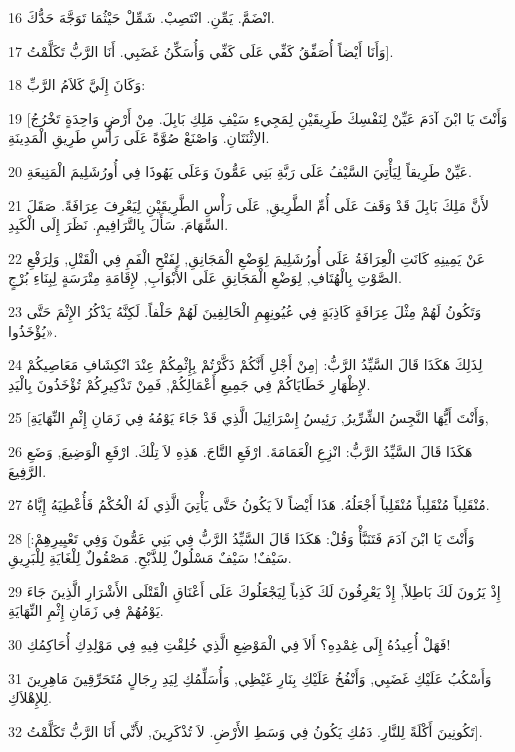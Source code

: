 \par 16 انْضَمَّ. يَمِّنِ. انْتَصِبْ. شَمِّلْ حَيْثُمَا تَوَجَّهَ حَدُّكَ.
\par 17 وَأَنَا أَيْضاً أُصَفِّقُ كَفِّي عَلَى كَفِّي وَأُسَكِّنُ غَضَبِي. أَنَا الرَّبُّ تَكَلَّمْتُ].
\par 18 وَكَانَ إِلَيَّ كَلاَمُ الرَّبِّ:
\par 19 [وَأَنْتَ يَا ابْنَ آدَمَ عَيِّنْ لِنَفْسِكَ طَرِيقَيْنِ لِمَجِيءِ سَيْفِ مَلِكِ بَابِلَ. مِنْ أَرْضٍ وَاحِدَةٍ تَخْرُجُ الاِثْنَتَانِ. وَاصْنَعْ صُوَّةً عَلَى رَأْسِ طَرِيقِ الْمَدِينَةِ.
\par 20 عَيِّنْ طَرِيقاً لِيَأْتِيَ السَّيْفُ عَلَى رَبَّةِ بَنِي عَمُّونَ وَعَلَى يَهُوذَا فِي أُورُشَلِيمَ الْمَنِيعَةِ.
\par 21 لأَنَّ مَلِكَ بَابِلَ قَدْ وَقَفَ عَلَى أُمِّ الطَّرِيقِ, عَلَى رَأْسِ الطَّرِيقَيْنِ لِيَعْرِفَ عِرَافَةً. صَقَلَ السِّهَامَ. سَأَلَ بِالتَّرَافِيمِ. نَظَرَ إِلَى الْكَبِدِ.
\par 22 عَنْ يَمِينِهِ كَانَتِ الْعِرَافَةُ عَلَى أُورُشَلِيمَ لِوَضْعِ الْمَجَانِقِ, لِفَتْحِ الْفَمِ فِي الْقَتْلِ, وَلِرَفْعِ الصَّوْتِ بِالْهُتَافِ, لِوَضْعِ الْمَجَانِقِ عَلَى الأَبْوَابِ, لإِقَامَةِ مِتْرَسَةٍ لِبِنَاءِ بُرْجٍ.
\par 23 وَتَكُونُ لَهُمْ مِثْلَ عِرَافَةٍ كَاذِبَةٍ فِي عُيُونِهِمِ الْحَالِفِينَ لَهُمْ حَلْفاً. لَكِنَّهُ يَذْكُرُ الإِثْمَ حَتَّى يُؤْخَذُوا».
\par 24 لِذَلِكَ هَكَذَا قَالَ السَّيِّدُ الرَّبُّ: [مِنْ أَجْلِ أَنَّكُمْ ذَكَّرْتُمْ بِإِثْمِكُمْ عِنْدَ انْكِشَافِ مَعَاصِيكُمْ لإِظْهَارِ خَطَايَاكُمْ فِي جَمِيعِ أَعْمَالِكُمْ, فَمِنْ تَذْكِيرِكُمْ تُؤْخَذُونَ بِالْيَدِ.
\par 25 [وَأَنْتَ أَيُّهَا النَّجِسُ الشِّرِّيرُ, رَئِيسُ إِسْرَائِيلَ الَّذِي قَدْ جَاءَ يَوْمُهُ فِي زَمَانِ إِثْمِ النِّهَايَةِ,
\par 26 هَكَذَا قَالَ السَّيِّدُ الرَّبُّ: انْزِعِ الْعَمَامَةَ. ارْفَعِ التَّاجَ. هَذِهِ لاَ تِلْكَ. ارْفَعِ الْوَضِيعَ, وَضَعِ الرَّفِيعَ.
\par 27 مُنْقَلِباً مُنْقَلِباً مُنْقَلِباً أَجْعَلُهُ. هَذَا أَيْضاً لاَ يَكُونُ حَتَّى يَأْتِيَ الَّذِي لَهُ الْحُكْمُ فَأُعْطِيَهُ إِيَّاهُ.
\par 28 [وَأَنْتَ يَا ابْنَ آدَمَ فَتَنَبَّأْ وَقُلْ: هَكَذَا قَالَ السَّيِّدُ الرَّبُّ فِي بَنِي عَمُّونَ وَفِي تَعْيِيرِهِمْ: سَيْفٌ! سَيْفٌ مَسْلُولٌ لِلذَّبْحِ. مَصْقُولٌ لِلْغَايَةِ لِلْبَرِيقِ.
\par 29 إِذْ يَرُونَ لَكَ بَاطِلاً, إِذْ يَعْرِفُونَ لَكَ كَذِباً لِيَجْعَلُوكَ عَلَى أَعْنَاقِ الْقَتْلَى الأَشْرَارِ الَّذِينَ جَاءَ يَوْمُهُمْ فِي زَمَانِ إِثْمِ النِّهَايَةِ.
\par 30 فَهَلْ أُعِيدُهُ إِلَى غِمْدِهِ؟ أَلاَ فِي الْمَوْضِعِ الَّذِي خُلِقْتِ فِيهِ فِي مَوْلِدِكِ أُحَاكِمُكِ!
\par 31 وَأَسْكُبُ عَلَيْكِ غَضَبِي, وَأَنْفُخُ عَلَيْكِ بِنَارِ غَيْظِي, وَأُسَلِّمُكِ لِيَدِ رِجَالٍ مُتَحَرِّقِينَ مَاهِرِينَ لِلإِهْلاَكِ.
\par 32 تَكُونِينَ أَكْلَةً لِلنَّارِ. دَمُكِ يَكُونُ فِي وَسَطِ الأَرْضِ. لاَ تُذْكَرِينَ, لأَنِّي أَنَا الرَّبُّ تَكَلَّمْتُ].

